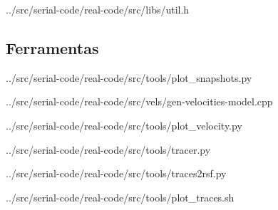 \begin{appendices}
	
	{../src/serial-code/real-code/src/libs/util.h}
	
	\subsection{Ferramentas}
	
	{../src/serial-code/real-code/src/tools/plot_snapshots.py}

	
	{../src/serial-code/real-code/src/vels/gen-velocities-model.cpp}

	
	{../src/serial-code/real-code/src/tools/plot_velocity.py}

	
	{../src/serial-code/real-code/src/tools/tracer.py}
	
	
	{../src/serial-code/real-code/src/tools/traces2rsf.py}
	
	
	{../src/serial-code/real-code/src/tools/plot_traces.sh}
	

\end{appendices}